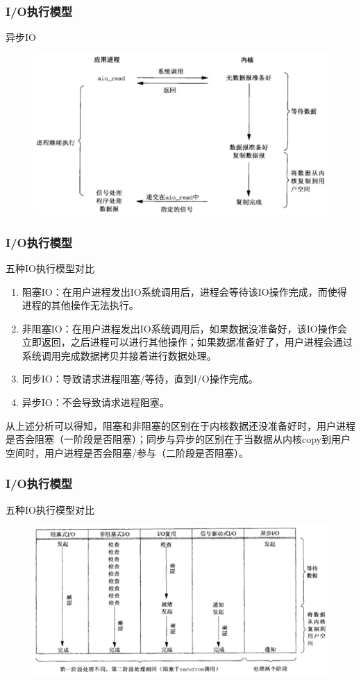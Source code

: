 \begin{frame}[fragile]
    \frametitle{I/O执行模型}
     异步IO
    \begin{figure}
        \includegraphics[width=0.7\linewidth]{figs/async-io.png}
    \end{figure}
\end{frame}
\begin{frame}[fragile]
    \frametitle{I/O执行模型}
    五种IO执行模型对比
    
    \begin{enumerate}
        
        \item 阻塞IO：在用户进程发出IO系统调用后，进程会等待该IO操作完成，而使得进程的其他操作无法执行。
        \item 非阻塞IO：在用户进程发出IO系统调用后，如果数据没准备好，该IO操作会立即返回，之后进程可以进行其他操作；如果数据准备好了，用户进程会通过系统调用完成数据拷贝并接着进行数据处理。
        \item 同步IO：导致请求进程阻塞/等待，直到I/O操作完成。
        \item 异步IO：不会导致请求进程阻塞。
    \end{enumerate}       
    
    从上述分析可以得知，阻塞和非阻塞的区别在于内核数据还没准备好时，用户进程是否会阻塞（一阶段是否阻塞）；同步与异步的区别在于当数据从内核copy到用户空间时，用户进程是否会阻塞/参与（二阶段是否阻塞）。
    
\end{frame}
\begin{frame}[fragile]
    \frametitle{I/O执行模型}
      五种IO执行模型对比
    \begin{figure}
        \includegraphics[width=0.8\linewidth]{figs/io-modes-compare.png}
    \end{figure}
\end{frame}

